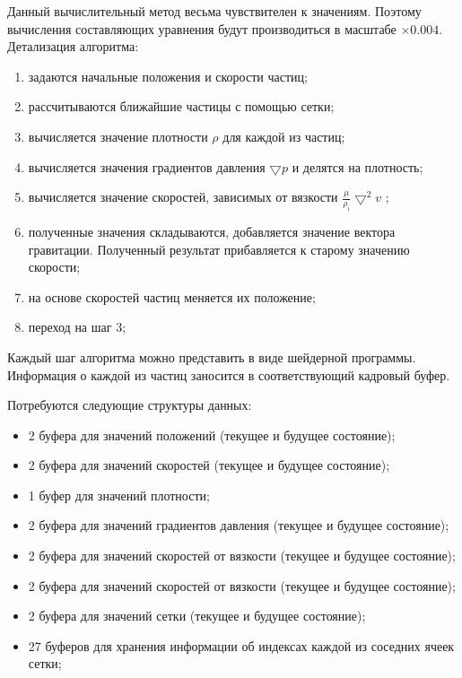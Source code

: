 Данный вычислительный метод весьма чувствителен к значениям. Поэтому вычисления составляющих
уравнения будут производиться в масштабе $\times0.004$. \\

Детализация алгоритма:

\begin{enumerate}
  \item задаются начальные положения и скорости частиц;
  \item рассчитываются ближайшие частицы с помощью сетки;
  \item вычисляется значение плотности $\rho$ для каждой из частиц;
  \item вычисляется значения градиентов давления $\bigtriangledown{}p$ и делятся на плотность;
  \item вычисляется значение скоростей, зависимых от вязкости $\frac{\mu}{\rho_i}\bigtriangledown^2v$ ;
  \item полученные значения складываются, добавляется значение вектора гравитации. Полученный
    результат прибавляется к старому значению скорости;
  \item на основе скоростей частиц меняется их положение;
  \item переход на шаг 3;
\end{enumerate}

Каждый шаг алгоритма можно представить в виде шейдерной программы. Информация о каждой из частиц 
заносится в соответствующий кадровый буфер. 

Потребуются следующие структуры данных:

\begin{itemize}
  \item 2 буфера для значений положений (текущее и будущее состояние);
  \item 2 буфера для значений скоростей (текущее и будущее состояние);
  \item 1 буфер для значений плотности;
  \item 2 буфера для значений градиентов давления (текущее и будущее состояние);
  \item 2 буфера для значений скоростей от вязкости (текущее и будущее состояние);
  \item 2 буфера для значений скоростей от вязкости (текущее и будущее состояние);
  \item 2 буфера для значений сетки (текущее и будущее состояние);
  \item 27 буферов для хранения информации об индексах каждой из соседних ячеек сетки;
\end{itemize}

